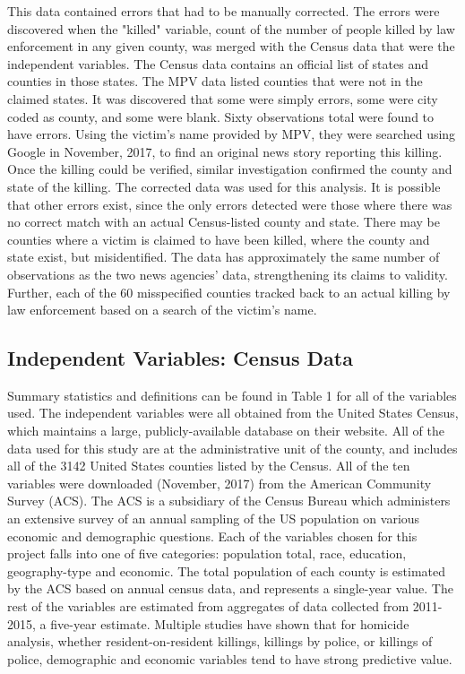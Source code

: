 \documentclass[sigconf]{acmart}
\begin{document}
This data contained errors that had to be manually corrected.  The errors were discovered when the "killed" variable, count of the number of people killed by law enforcement in any given county, was merged with the Census data that were the independent variables.  The Census data contains an official list of states and counties in those states. The MPV data listed counties that were not in the claimed states.  It was discovered that some were simply errors, some were city coded as county, and some were blank.  Sixty observations total were found to have errors.  Using the victim's name provided by MPV, they were searched using Google in November, 2017, to find an original news story reporting this killing.  Once the killing could be verified, similar investigation confirmed the county and state of the killing.  The corrected data was used for this analysis.  It is possible that other errors exist, since the only errors detected were those where there was no correct match with an actual Census-listed county and state.  There may be counties where a victim is claimed to have been killed, where the county and state exist, but misidentified.  The data has approximately the same number of observations as the two news agencies' data, strengthening its claims to validity.  Further, each of the 60 misspecified counties tracked back to an actual killing by law enforcement based on a search of the victim's name.

\subsection{Independent Variables: Census Data}
Summary statistics and definitions can be found in Table 1 for all of the variables used.  The independent variables were all obtained from the United States Census, which maintains a large, publicly-available database on their website. \cite{census}  All of the data used for this study are at the administrative unit of the county, and includes all of the 3142 United States counties listed by the Census.  All of the ten variables were downloaded (November, 2017) from the American Community Survey (ACS). The ACS is a subsidiary of the Census Bureau which administers an extensive survey of an annual sampling of the US population on various economic and demographic questions.  Each of the variables chosen for this project falls into one of five categories: population total, race, education, geography-type and economic.  The total population of each county is estimated by the ACS based on annual census data, and represents a single-year value.  The rest of the variables are estimated from aggregates of data collected from 2011-2015, a five-year estimate.  Multiple studies have shown that for homicide analysis, whether resident-on-resident killings, killings by police, or killings of police, demographic and economic variables tend to have strong predictive value. \cite{pridemore05,kaminski05,legewie15,patterson16,smith14}
\end{document}
